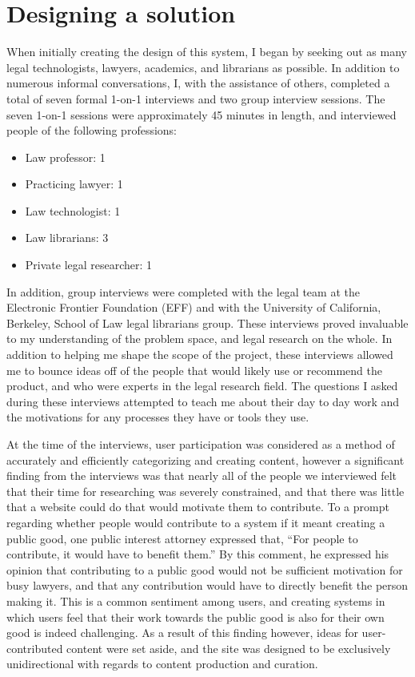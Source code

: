 \label{solutiondesign}
\section{Designing a solution}
When initially creating the design of this system, I began by seeking out as many legal technologists, lawyers, academics, and librarians as possible. In addition to numerous informal conversations, I, with the assistance of others, completed a total of seven formal 1-on-1 interviews and two group interview sessions. The seven 1-on-1 sessions were approximately 45 minutes in length, and interviewed people of the following professions:
\begin{itemize}
\item Law professor: 1 
\item Practicing lawyer: 1
\item Law technologist: 1
\item Law librarians: 3
\item Private legal researcher: 1
\end{itemize}
In addition, group interviews were completed with the legal team at the Electronic Frontier Foundation (EFF) and with the University of California, Berkeley, School of Law legal librarians group. These interviews proved invaluable to my understanding of the problem space, and legal research on the whole. In addition to helping me shape the scope of the project, these interviews allowed me to bounce ideas off of the people that would likely use or recommend the product, and who were experts in the legal research field. The questions I asked during these interviews attempted to teach me about their day to day work and the motivations for any processes they have or tools they use. 

At the time of the interviews, user participation was considered as a method of accurately and efficiently categorizing and creating content, however a significant finding from the interviews was that nearly all of the people we interviewed felt that their time for researching was severely constrained, and that there was little that a website could do that would motivate them to contribute. To a prompt regarding whether people would contribute to a system if it meant creating a public good, one public interest attorney expressed that, ``For people to contribute, it would have to benefit them.'' By this comment, he expressed his opinion that contributing to a public good would not be sufficient motivation for busy lawyers, and that any contribution would have to directly benefit the person making it. This is a common sentiment among users, and creating systems in which users feel that their work towards the public good is also for their own good is indeed challenging. As a result of this finding however, ideas for user-contributed content were set aside, and the site was designed to be exclusively unidirectional with regards to content production and curation.


